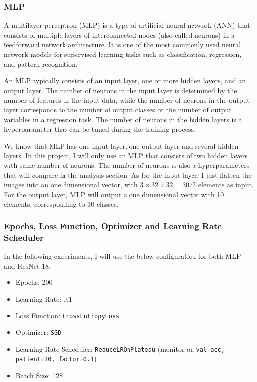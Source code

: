 \documentclass[twocolumn]{extarticle}
\begin{document}
\subsubsection{MLP}

A multilayer perceptron (MLP) is a type of artificial neural network (ANN) that consists of multiple layers of interconnected nodes (also called neurons) in a feedforward network architecture. It is one of the most commonly used neural network models for supervised learning tasks such as classification, regression, and pattern recognition.


An MLP typically consists of an input layer, one or more hidden layers, and an output layer. The number of neurons in the input layer is determined by the number of features in the input data, while the number of neurons in the output layer corresponds to the number of output classes or the number of output variables in a regression task. The number of neurons in the hidden layers is a hyperparameter that can be tuned during the training process.

We know that MLP has one input layer, one output layer and several hidden layers. In this project, I will only use an MLP that consists of two hidden layers with same number of neurons. The number of neurons is also a hyperparameters that will compare in the analysis section. As for the input layer, I just flatten the images into an one dimensional vector, with $3 \times 32 \times 32 = 3072$ elements as input. For the output layer, MLP will output a one dimensional vector with 10 elements, corresponding to 10 classes.

\subsubsection{Epochs, Loss Function, Optimizer and Learning Rate Scheduler}

In the following experiments, I will use the below configuration for both MLP and ResNet-18. 

\begin{itemize}
\item Epochs: 200
\item Learning Rate: 0.1
\item Loss Function: \texttt{CrossEntropyLoss}
\item Optimizer: \texttt{SGD}
\item Learning Rate Scheduler: \texttt{ReduceLROnPlateau} (monitor on \texttt{val\_acc, patient=10, factor=0.1})
\item Batch Size: 128
\end{itemize}
\end{document}
